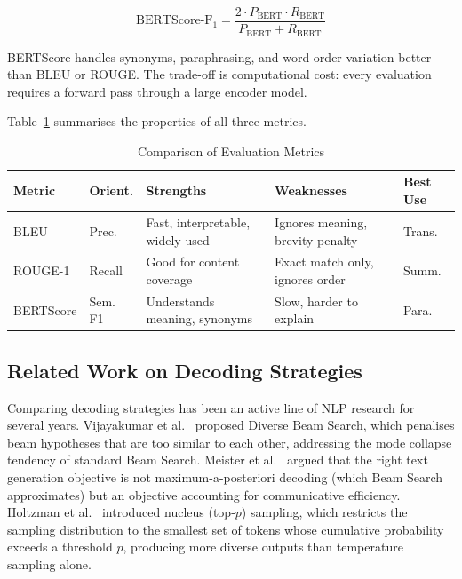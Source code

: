 \documentclass[12pt]{article}
\begin{document}
	\begin{equation}
		\mathrm{BERTScore\text{-}F_1} = \frac{2 \cdot P_{\mathrm{BERT}} \cdot R_{\mathrm{BERT}}}{P_{\mathrm{BERT}} + R_{\mathrm{BERT}}}
		\label{eq:bertscore}
	\end{equation}
	
	BERTScore handles synonyms, paraphrasing, and word order variation better than BLEU or ROUGE. The trade-off is computational cost: every evaluation requires a forward pass through a large encoder model.
	
	Table~\ref{tab:metrics_compare} summarises the properties of all three metrics.
	
\begin{table}[H]
	\centering
	\caption{Comparison of Evaluation Metrics}
	\label{tab:metrics_compare}
	\footnotesize
	\setlength{\tabcolsep}{3pt}
	\begin{tabularx}{\linewidth}{|l|l|X|X|l|}
		\hline
		\textbf{Metric} & \textbf{Orient.} & \textbf{Strengths} & \textbf{Weaknesses} & \textbf{Best Use} \\ \hline
		BLEU & Prec. & Fast, interpretable, widely used & Ignores meaning, brevity penalty & Trans. \\ \hline
		ROUGE-1 & Recall & Good for content coverage & Exact match only, ignores order & Summ. \\ \hline
		BERTScore & Sem. F1 & Understands meaning, synonyms & Slow, harder to explain & Para. \\ \hline
	\end{tabularx}
\end{table}

	\subsection{Related Work on Decoding Strategies}
	
	Comparing decoding strategies has been an active line of NLP research for several years. Vijayakumar et al.~\cite{vijayakumar2018diverse} proposed Diverse Beam Search, which penalises beam hypotheses that are too similar to each other, addressing the mode collapse tendency of standard Beam Search. Meister et al.~\cite{meister2020beam} argued that the right text generation objective is not maximum-a-posteriori decoding (which Beam Search approximates) but an objective accounting for communicative efficiency. Holtzman et al.~\cite{holtzman2020curious} introduced nucleus (top-$p$) sampling, which restricts the sampling distribution to the smallest set of tokens whose cumulative probability exceeds a threshold $p$, producing more diverse outputs than temperature sampling alone.
	
\end{document}
